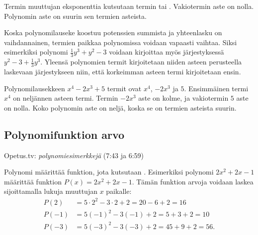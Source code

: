 Termin muuttujan eksponenttia kutsutaan termin  tai .
Vakiotermin aste on nolla. Polynomin aste on suurin sen termien asteista.

Koska polynomilauseke koostuu potenssien summista ja yhteenlasku on vaihdannainen, termien paikkaa polynomissa voidaan vapaasti vaihtaa. Siksi esimerkiksi polynomi $\frac{1}{3}y^3+y^2-3$ voidaan kirjoittaa myös järjestyksessä $y^2-3+\frac{1}{3}y^3$. Yleensä polynomien termit kirjoitetaan niiden asteen perusteella laskevaan järjestykseen niin, että korkeimman asteen termi kirjoitetaan ensin.

\begin{esimerkki}
Polynomilausekkeen $x^4-2x^3+5$ termit ovat $x^4$, $-2x^3$ ja $5$.
Ensimmäinen termi $x^4$ on neljännen asteen termi. Termin $-2x^3$ aste on kolme, ja vakiotermin $5$ aste on nolla.
Koko polynomin aste on neljä, koska se on termien asteista suurin.
\end{esimerkki}



\subsection*{Polynomifunktion arvo}

{Opetus.tv: \emph{polynomiesimerkkejä} (7:43 ja 6:59)}

Polynomi määrittää funktion, jota kutsutaan . Esimerkiksi polynomi $2x^2+2x-1$ määrittää funktion $P(x)=2x^2+2x-1$. Tämän funktion arvoja voidaan laskea sijoittamalla lukuja muuttujan $x$ paikalle:
\begin{align*}
P(2) & = 5\cdot 2^2-3\cdot 2+2 = 20 - 6 + 2 = 16 \\
P(-1) & = 5(-1)^2-3(-1)+2 = 5 + 3 + 2 = 10 \\
P(-3) & = 5(-3)^2-3(-3)+2 = 45 + 9 + 2 = 56.
\end{align*}

